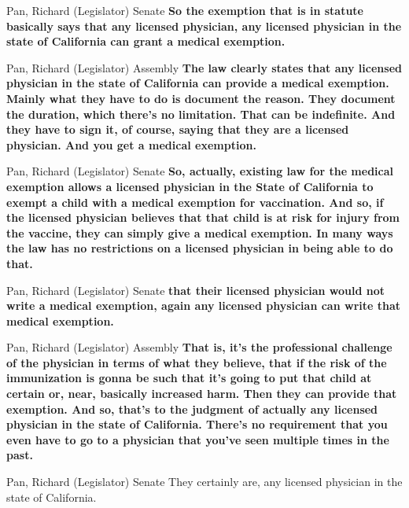 \begin{result}{22.398952927698552}{Pan, Richard (Legislator) Senate}
\textbf{So the exemption that is in statute basically says that any licensed physician, any licensed physician in the state of California can grant a medical exemption.
}\end{result}

\begin{result}{21.591685490649436}{Pan, Richard (Legislator) Assembly}
\textbf{The law clearly states that any licensed physician in the state of California can provide a medical exemption. Mainly what they have to do is document the reason. They document the duration, which there's no limitation. That can be indefinite. And they have to sign it, of course, saying that they are a licensed physician. And you get a medical exemption.
}\end{result}

\begin{result}{19.281240261790572}{Pan, Richard (Legislator) Senate}
\textbf{So, actually, existing law for the medical exemption allows a licensed physician in the State of California to exempt a child with a medical exemption for vaccination. And so, if the licensed physician believes that that child is at risk for injury from the vaccine, they can simply give a medical exemption. In many ways the law has no restrictions on a licensed physician in being able to do that.
}\end{result}

\begin{result}{18.572197801528077}{Pan, Richard (Legislator) Senate}
\textbf{that their licensed physician would not write a medical exemption, again any licensed physician can write that medical exemption.
}\end{result}

\begin{result}{17.785507332229226}{Pan, Richard (Legislator) Assembly}
\textbf{That is, it's the professional challenge of the physician in terms of what they believe, that if the risk of the immunization is gonna be such that it's going to put that child at certain or, near, basically increased harm. Then they can provide that exemption. And so, that's to the judgment of actually any licensed physician in the state of California. There's no requirement that you even have to go to a physician that you've seen multiple times in the past.
}\end{result}

\begin{result}{15.941329185646078}{Pan, Richard (Legislator) Senate}
They certainly are, any licensed physician in the state of California.
\end{result}

